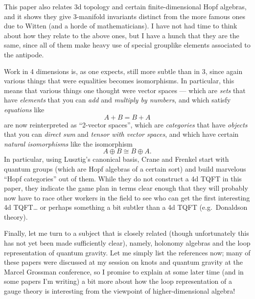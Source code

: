 \documentclass{article}
\def\tightlist{}
\renewcommand{\texttt}[1]{%
  \begingroup
  \ttfamily
  \begingroup\lccode`~=`/\lowercase{\endgroup\def~}{/\discretionary{}{}{}}%
  \begingroup\lccode`~=`[\lowercase{\endgroup\def~}{[\discretionary{}{}{}}%
  \begingroup\lccode`~=`.\lowercase{\endgroup\def~}{.\discretionary{}{}{}}%
  \catcode`/=\active\catcode`[=\active\catcode`.=\active
  \scantokens{#1\noexpand}%
  \endgroup
}
\begin{document}
\noindent
This paper also relates 3d topology and certain finite-dimensional
Hopf algebras, and it shows they give 3-manifold invariants distinct
from the more famous ones due to Witten (and a horde of mathematicians).
I have not had time to think about how they relate to the above ones,
but I have a hunch that they are the same, since all of them make heavy
use of special grouplike elements associated to the antipode.

\noindent
Work in 4 dimensions is, as one expects, still more subtle than in 3,
since again various things that were equalities becomes isomorphisms. In
particular, this means that various things one thought were vector
spaces --- which are \emph{sets} that have \emph{elements} that you can
\emph{add} and \emph{multiply by numbers}, and which satisfy
\emph{equations} like \[A + B = B + A\] are now reinterpreted as
``2-vector spaces'', which are \emph{categories} that have
\emph{objects} that you can \emph{direct sum} and \emph{tensor with
vector spaces}, and which have certain \emph{natural isomorphisms} like
the isomorphism \[A \oplus B \cong B \oplus A.\] In particular, using
Lusztig's canonical basis, Crane and Frenkel start with quantum groups
(which are Hopf algebras of a certain sort) and build marvelous ``Hopf
categories'' out of them. While they do not construct a 4d TQFT in this
paper, they indicate the game plan in terms clear enough that they will
probably now have to race other workers in the field to see who can get
the first interesting 4d TQFT\ldots{} or perhaps something a bit subtler
than a 4d TQFT (e.g.~Donaldson theory).

Finally, let me turn to a subject that is closely related (though
unfortunately this has not yet been made sufficiently clear), namely,
holonomy algebras and the loop representation of quantum gravity. Let me
simply list the references now; many of these papers were discussed at
my session on knots and quantum gravity at the Marcel Grossman
conference, so I promise to explain at some later time (and in some
papers I'm writing) a bit more about how the loop representation of a
gauge theory is interesting from the viewpoint of higher-dimensional
algebra!
\end{document}
